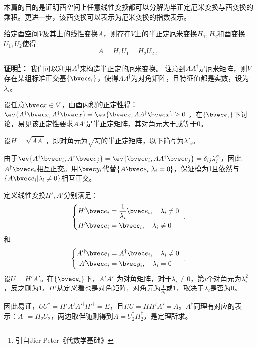 本篇的目的是证明酉空间上任意线性变换都可以分解为半正定厄米变换与酉变换的乘积。更进一步，该酉变换可以表示为厄米变换的指数表示。
\begin{theorem}{}\label{the_PoDe_2}
给定酉空间$V$及其上的线性变换$A$，则存在$V$上的半正定厄米变换$H_1,H_2$和酉变换$U_1,U_2$使得
\begin{equation}
A=H_1U_1=H_2U_2~,
\end{equation}
\end{theorem}
\textbf{证明\footnote{引自Jier Peter《代数学基础》}：}
我们可以利用$A^{\dagger}$来构造半正定的厄米变换。
注意到$AA^{\dagger}$是厄米矩阵，则$V$存在某组标准正交基$\{\bvec e_i\}$，使得$AA^{\dagger}$为对角矩阵，且特征值都是实数，设为$\lambda_i$。

设任意$\bvec x\in V$，由酉内积的正定性得：$\ev{A^{\dagger}\bvec x,A^{\dagger}\bvec x}=\ev{\bvec x,AA^{\dagger}\bvec x}\ge 0$
，在$\{\bvec e_i\}$下讨论，易见该正定性要求$AA^{\dagger}$是半正定矩阵，其对角元大于或等于0。

设$H=\sqrt{AA^{\dagger}}$，即对角元为$\sqrt{\lambda_i}$的半正定矩阵，以下简写为$\lambda'_i$。

由于$\ev{A^{\dagger}\bvec e_i,A^{\dagger}\bvec e_j}=\ev{\bvec e_i,AA^{\dagger}\bvec e_j}=\delta_{ij}\lambda'^2_j$，因此$A^{\dagger}\bvec e_i$相互正交。用$\bvec y_i$代替$\{A\bvec e_i|\lambda_i=0\}$，保证模为1且依然与$\{A\bvec e_i|\lambda_i\neq 0\}$相互正交。

定义线性变换$H',A'$分别满足：
\begin{equation}
\left\{
    \begin{aligned}
    H'\bvec e_i&=\frac{1}{\lambda_i}\bvec e_i,\quad\lambda_i\neq 0\\
    H'\bvec e_i&=\bvec e_i,\quad\lambda_i\neq 0
    \end{aligned}
    \right.~.
\end{equation}
和
\begin{equation}
\left\{
    \begin{aligned}
    A'^{\dagger}\bvec e_i&=A^{\dagger}\bvec e_i,\quad\lambda_i\neq 0\\
    A'\bvec e_i&=\bvec y_i,\quad\lambda_i= 0
    \end{aligned}
    \right.~.
\end{equation}
设$U=H'A'$。在$\{\bvec e_i\}$下，$A'A'^{\dagger}$为对角矩阵，对于$\lambda_i\neq 0$，第$i$个对角元为$\lambda_i^2$，反之则为1。$H'$从定义看也是对角矩阵，对角元为$\frac{1}{\lambda_i}$或$1$，取决于$\lambda_i$是否为0。

因此易证，$UU^{\dagger}=H'A'A'^{\dagger}H'^{\dagger}=E$，且$HU=HH'A'=A$。$A^{\dagger}$同理有对应的表示：$A^{\dagger}=H_2U_2$，两边取伴随则得到$A=U_2^{\dagger}H^{\dagger}_2$，是定理所求。


